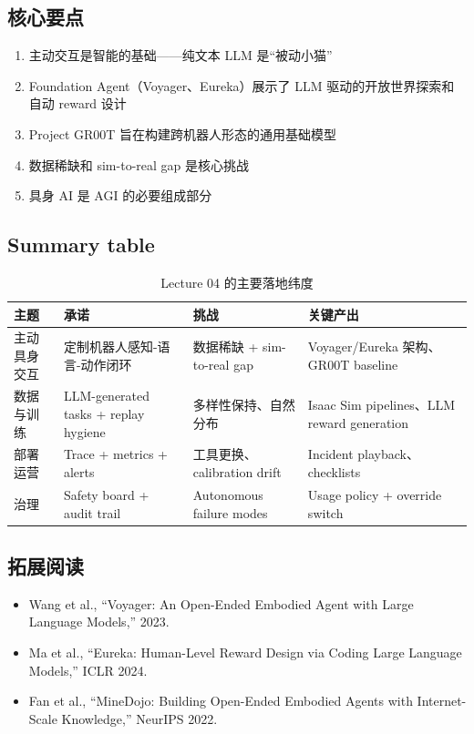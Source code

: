 \documentclass[a4paper]{article}
\begin{document}
\subsection{核心要点}

\begin{enumerate}
    \item 主动交互是智能的基础——纯文本 LLM 是``被动小猫''
    \item Foundation Agent（Voyager、Eureka）展示了 LLM 驱动的开放世界探索和自动 reward 设计
    \item Project GR00T 旨在构建跨机器人形态的通用基础模型
    \item 数据稀缺和 sim-to-real gap 是核心挑战
    \item 具身 AI 是 AGI 的必要组成部分
\end{enumerate}

\subsection{Summary table}

\begin{table}[H]
\centering
\begin{tabular}{p{} p{} p{} p{}}
\toprule
主题 & 承诺 & 挑战 & 关键产出 \\
\midrule
主动具身交互 & 定制机器人感知-语言-动作闭环 & 数据稀缺 + sim-to-real gap & Voyager/Eureka 架构、GR00T baseline \\
数据与训练 & LLM-generated tasks + replay hygiene & 多样性保持、自然分布 & Isaac Sim pipelines、LLM reward generation \\
部署运营 & Trace + metrics + alerts & 工具更换、calibration drift & Incident playback、checklists \\
治理 & Safety board + audit trail & Autonomous failure modes & Usage policy + override switch \\
\bottomrule
\end{tabular}
\caption{Lecture 04 的主要落地纬度}
\end{table}

\subsection{拓展阅读}

\begin{itemize}
    \item Wang et al., ``Voyager: An Open-Ended Embodied Agent with Large Language Models,'' 2023.
    \item Ma et al., ``Eureka: Human-Level Reward Design via Coding Large Language Models,'' ICLR 2024.
    \item Fan et al., ``MineDojo: Building Open-Ended Embodied Agents with Internet-Scale Knowledge,'' NeurIPS 2022.
\end{itemize}
\end{document}
